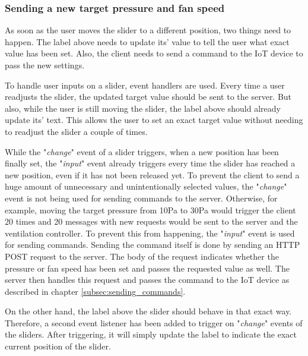 \subsubsection{Sending a new target pressure and fan speed}
\label{subsec:sending_a_new_target_pressure_and_fan_speed}

As soon as the user moves the slider to a different position, two things need to happen. The label above needs to update its' value to tell the user what exact value has been set. Also, the client needs to send a command to the IoT device to pass the new settings.

To handle user inputs on a slider, event handlers are used. Every time a user readjusts the slider, the updated target value should be sent to the server. But also, while the user is still moving the slider, the label above should already update its' text. This allows the user to set an exact target value without needing to readjust the slider a couple of times.

While the "\textit{change}" event of a slider triggers, when a new position has been finally set, the "\textit{input}" event already triggers every time the slider has reached a new position, even if it has not been released yet. To prevent the client to send a huge amount of unnecessary and unintentionally selected values, the "\textit{change}" event is not being used for sending commands to the server. Otherwise, for example, moving the target pressure from 10Pa to 30Pa would trigger the client 20 times and 20 messages with new requests would be sent to the server and the ventilation controller. To prevent this from happening, the "\textit{input}" event is used for sending commands. Sending the command itself is done by sending an HTTP POST request to the server. The body of the request indicates whether the pressure or fan speed has been set and passes the requested value as well. The server then handles this request and passes the command to the IoT device as described in chapter \ref{subsec:sending_commands}.

On the other hand, the label above the slider should behave in that exact way. Therefore, a second event listener has been added to trigger on "\textit{change}" events of the sliders. After triggering, it will simply update the label to indicate the exact current position of the slider.





